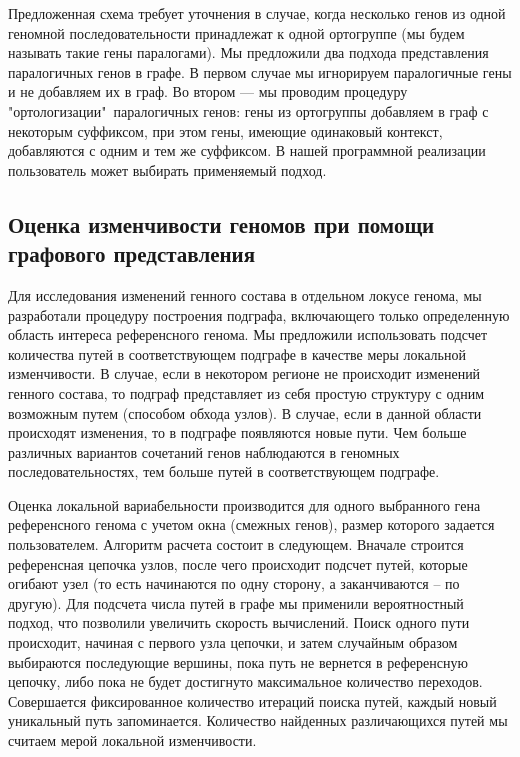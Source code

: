 Предложенная схема требует уточнения в случае, когда несколько генов из одной геномной последовательности принадлежат к одной ортогруппе (мы будем называть такие гены паралогами). Мы предложили два подхода представления паралогичных генов в графе. В первом случае мы игнорируем паралогичные гены и не добавляем их в граф. Во втором --- мы проводим процедуру "ортологизации"\ паралогичных генов: гены из ортогруппы добавляем в граф с некоторым суффиксом, при этом гены, имеющие одинаковый контекст, добавляются с одним и тем же суффиксом. В нашей программной реализации пользователь может выбирать применяемый подход. 

\subsection*{Оценка изменчивости геномов при помощи графового представления}

Для исследования изменений генного состава в отдельном локусе генома, мы разработали процедуру построения подграфа, включающего только определенную область интереса референсного генома. Мы предложили использовать подсчет количества путей в соответствующем подграфе в качестве меры локальной изменчивости. В случае, если в некотором регионе не происходит изменений генного состава, то подграф представляет из себя простую структуру с одним возможным путем (способом обхода узлов). В случае, если в данной области происходят изменения, то в подграфе появляются новые пути. Чем больше различных вариантов сочетаний генов наблюдаются в геномных последовательностях, тем больше путей в соответствующем подграфе. 

Оценка локальной вариабельности производится для одного выбранного гена референсного генома с учетом окна (смежных генов), размер которого задается пользователем. Алгоритм расчета состоит в следующем. Вначале строится референсная цепочка узлов, после чего происходит подсчет путей, которые огибают узел (то есть начинаются по одну сторону, а заканчиваются -- по другую). Для подсчета числа путей в графе мы применили вероятностный подход, что позволили увеличить скорость вычислений. Поиск одного пути происходит, начиная с первого узла цепочки, и затем  случайным образом выбираются последующие вершины, пока путь не вернется в референсную цепочку, либо пока не будет достигнуто максимальное количество переходов. Совершается фиксированное количество итераций поиска путей, каждый новый уникальный путь запоминается. Количество найденных различающихся путей мы считаем мерой локальной изменчивости.

